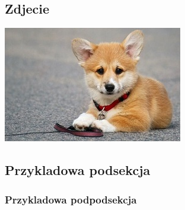 \documentclass{report}
\begin{document}
        \subsection{Zdjecie}
            \includegraphics{corgi.jpg}

        \subsection{Przykladowa podsekcja}
            \subsubsection{Przykladowa podpodsekcja}
\end{document}
